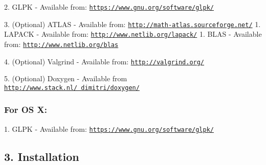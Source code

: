 \begin{DoxyPre}2. GLPK - Available from: \href{https://www.gnu.org/software/glpk/}{\tt https://www.gnu.org/software/glpk/}\end{DoxyPre}



\begin{DoxyPre}3. (Optional) ATLAS - Available from: \href{http://math-atlas.sourceforge.net/}{\tt http://math-atlas.sourceforge.net/}
  1. LAPACK - Available from: \href{http://www.netlib.org/lapack/}{\tt http://www.netlib.org/lapack/}
    1. BLAS - Available from: \href{http://www.netlib.org/blas}{\tt http://www.netlib.org/blas}\end{DoxyPre}



\begin{DoxyPre}4. (Optional) Valgrind - Available from: \href{http://valgrind.org/}{\tt http://valgrind.org/}\end{DoxyPre}



\begin{DoxyPre}5. (Optional) Doxygen - Available from \href{http://www.stack.nl/~dimitri/doxygen/}{\tt http://www.stack.nl/~dimitri/doxygen/}\end{DoxyPre}



\begin{DoxyPre}\subsubsection*{For OS X:}\end{DoxyPre}



\begin{DoxyPre}\end{DoxyPre}



\begin{DoxyPre}1. GLPK - Available from: \href{https://www.gnu.org/software/glpk/}{\tt https://www.gnu.org/software/glpk/}


\end{DoxyPre}



\begin{DoxyPre}\subsection*{3. Installation}\end{DoxyPre}



